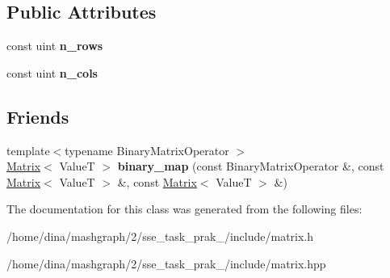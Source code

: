 \subsection*{Public Attributes}
\begin{DoxyCompactItemize}
\item 
\hypertarget{class_matrix_ad781905cc3a0e68cf6322bb4cac01763}{const uint {\bfseries n\-\_\-rows}}\label{class_matrix_ad781905cc3a0e68cf6322bb4cac01763}

\item 
\hypertarget{class_matrix_a39f2148129a8319122d01075343f9d5a}{const uint {\bfseries n\-\_\-cols}}\label{class_matrix_a39f2148129a8319122d01075343f9d5a}

\end{DoxyCompactItemize}
\subsection*{Friends}
\begin{DoxyCompactItemize}
\item 
\hypertarget{class_matrix_a6e65ed2e1c777bdf1e10e9ba5883f882}{{\footnotesize template$<$typename Binary\-Matrix\-Operator $>$ }\\\hyperlink{class_matrix}{Matrix}$<$ Value\-T $>$ {\bfseries binary\-\_\-map} (const Binary\-Matrix\-Operator \&, const \hyperlink{class_matrix}{Matrix}$<$ Value\-T $>$ \&, const \hyperlink{class_matrix}{Matrix}$<$ Value\-T $>$ \&)}\label{class_matrix_a6e65ed2e1c777bdf1e10e9ba5883f882}

\end{DoxyCompactItemize}


The documentation for this class was generated from the following files\-:\begin{DoxyCompactItemize}
\item 
/home/dina/mashgraph/2/sse\-\_\-task\-\_\-prak\-\_/include/matrix.\-h\item 
/home/dina/mashgraph/2/sse\-\_\-task\-\_\-prak\-\_/include/matrix.\-hpp\end{DoxyCompactItemize}
